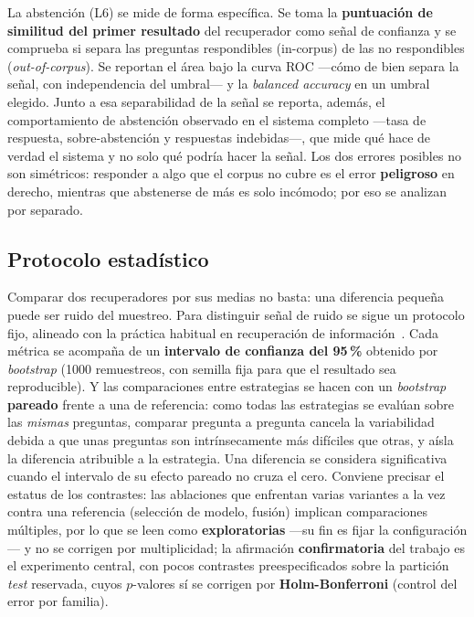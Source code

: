 La abstención (L6) se mide de forma específica. Se toma la \textbf{puntuación de similitud del primer resultado} del recuperador como señal de confianza y se comprueba si separa las preguntas respondibles (in-corpus) de las no respondibles (\emph{out-of-corpus}). Se reportan el área bajo la curva ROC —cómo de bien separa la señal, con independencia del umbral— y la \emph{balanced accuracy} en un umbral elegido. Junto a esa separabilidad de la señal se reporta, además, el comportamiento de abstención observado en el sistema completo —tasa de respuesta, sobre-abstención y respuestas indebidas—, que mide qué hace de verdad el sistema y no solo qué podría hacer la señal. Los dos errores posibles no son simétricos: responder a algo que el corpus no cubre es el error \textbf{peligroso} en derecho, mientras que abstenerse de más es solo incómodo; por eso se analizan por separado.

\subsection{Protocolo estadístico}
\label{subsec:protocolo}

Comparar dos recuperadores por sus medias no basta: una diferencia pequeña puede ser ruido del muestreo. Para distinguir señal de ruido se sigue un protocolo fijo, alineado con la práctica habitual en recuperación de información~\cite{smucker2007significance}. Cada métrica se acompaña de un \textbf{intervalo de confianza del 95\,\%} obtenido por \emph{bootstrap} (1000 remuestreos, con semilla fija para que el resultado sea reproducible). Y las comparaciones entre estrategias se hacen con un \emph{bootstrap} \textbf{pareado} frente a una de referencia: como todas las estrategias se evalúan sobre las \emph{mismas} preguntas, comparar pregunta a pregunta cancela la variabilidad debida a que unas preguntas son intrínsecamente más difíciles que otras, y aísla la diferencia atribuible a la estrategia. Una diferencia se considera significativa cuando el intervalo de su efecto pareado no cruza el cero. Conviene precisar el estatus de los contrastes: las ablaciones que enfrentan varias variantes a la vez contra una referencia (selección de modelo, fusión) implican comparaciones múltiples, por lo que se leen como \textbf{exploratorias} —su fin es fijar la configuración— y no se corrigen por multiplicidad; la afirmación \textbf{confirmatoria} del trabajo es el experimento central, con pocos contrastes preespecificados sobre la partición \emph{test} reservada, cuyos $p$-valores sí se corrigen por \textbf{Holm-Bonferroni} (control del error por familia).

